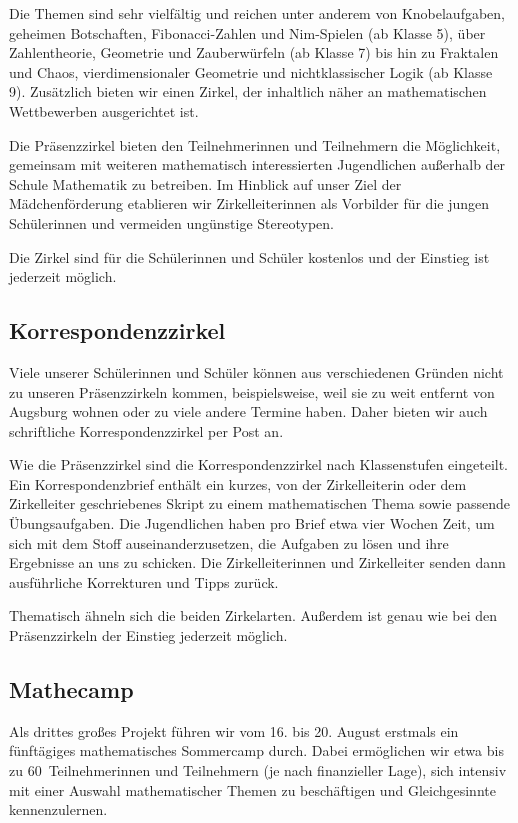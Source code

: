 \documentclass[12pt]{zettel}
\begin{document}
Die Themen sind sehr vielfältig und reichen unter anderem von
Knobelaufgaben, geheimen Botschaften, Fibonacci-Zahlen und Nim-Spielen (ab Klasse 5),
über Zahlentheorie, Geometrie und Zauberwürfeln (ab Klasse 7) bis hin zu
Fraktalen und Chaos, vierdimensionaler Geometrie und nichtklassischer Logik
(ab Klasse 9). Zusätzlich bieten wir einen Zirkel, der inhaltlich näher an
mathematischen Wettbewerben ausgerichtet ist.

Die Präsenzzirkel bieten den Teilnehmerinnen und Teilnehmern die Möglichkeit,
gemeinsam mit weiteren mathematisch interessierten Jugendlichen außerhalb der
Schule Mathematik zu betreiben. Im Hinblick auf unser Ziel der Mädchenförderung etablieren wir Zirkelleiterinnen als Vorbilder für die jungen Schülerinnen und vermeiden ungünstige Stereotypen.

Die Zirkel sind für die Schülerinnen und Schüler kostenlos und der Einstieg ist jederzeit möglich.

\subsection{Korrespondenzzirkel}

Viele unserer Schülerinnen und Schüler können aus verschiedenen Gründen
nicht zu unseren Präsenzzirkeln kommen, beispielsweise, weil sie zu weit
entfernt von Augsburg wohnen oder zu viele andere Termine haben.
Daher bieten wir auch schriftliche Korrespondenzzirkel per Post
an.

Wie die Präsenzzirkel sind die Korrespondenzzirkel nach Klassenstufen eingeteilt. Ein
Korrespondenzbrief enthält ein kurzes, von der Zirkelleiterin oder dem
Zirkelleiter geschriebenes Skript zu einem mathematischen Thema sowie passende
Übungsaufgaben. Die Jugendlichen haben pro Brief etwa vier Wochen Zeit, um sich
mit dem Stoff auseinanderzusetzen, die Aufgaben zu lösen und ihre Ergebnisse
an uns zu schicken. Die Zirkelleiterinnen und Zirkelleiter senden dann
ausführliche Korrekturen und Tipps zurück.

Thematisch ähneln sich die beiden Zirkelarten. Außerdem ist genau wie bei den
Präsenzzirkeln der Einstieg jederzeit möglich.


\subsection{Mathecamp}

Als drittes großes Projekt führen wir vom 16. bis 20. August erstmals ein fünftägiges
mathematisches Sommercamp durch. Dabei ermöglichen wir etwa bis zu 60~Teilnehmerinnen
und Teilnehmern (je nach finanzieller Lage), sich intensiv mit einer Auswahl mathematischer Themen zu
beschäftigen und Gleichgesinnte kennenzulernen.
\end{document}
